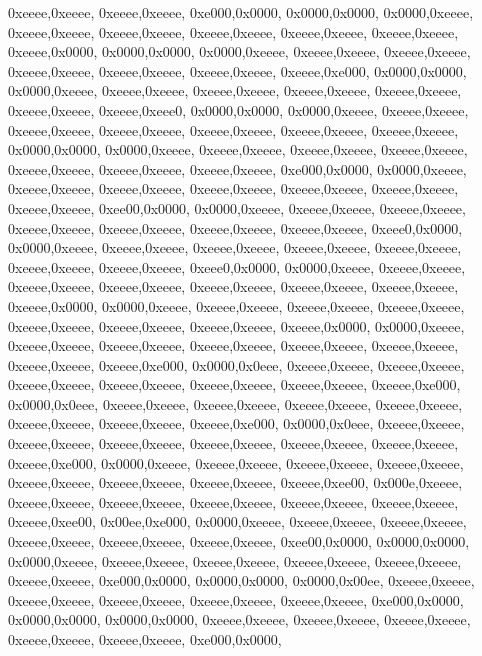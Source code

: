 {	0xeeee,0xeeee,
	0xeeee,0xeeee,
	0xe000,0x0000,
	0x0000,0x0000,
	0x0000,0xeeee,
	0xeeee,0xeeee,
	0xeeee,0xeeee,
	0xeeee,0xeeee,
	0xeeee,0xeeee,
	0xeeee,0xeeee,
	0xeeee,0x0000,
	0x0000,0x0000,
	0x0000,0xeeee,
	0xeeee,0xeeee,
	0xeeee,0xeeee,
	0xeeee,0xeeee,
	0xeeee,0xeeee,
	0xeeee,0xeeee,
	0xeeee,0xe000,
	0x0000,0x0000,
	0x0000,0xeeee,
	0xeeee,0xeeee,
	0xeeee,0xeeee,
	0xeeee,0xeeee,
	0xeeee,0xeeee,
	0xeeee,0xeeee,
	0xeeee,0xeee0,
	0x0000,0x0000,
	0x0000,0xeeee,
	0xeeee,0xeeee,
	0xeeee,0xeeee,
	0xeeee,0xeeee,
	0xeeee,0xeeee,
	0xeeee,0xeeee,
	0xeeee,0xeeee,
	0x0000,0x0000,
	0x0000,0xeeee,
	0xeeee,0xeeee,
	0xeeee,0xeeee,
	0xeeee,0xeeee,
	0xeeee,0xeeee,
	0xeeee,0xeeee,
	0xeeee,0xeeee,
	0xe000,0x0000,
	0x0000,0xeeee,
	0xeeee,0xeeee,
	0xeeee,0xeeee,
	0xeeee,0xeeee,
	0xeeee,0xeeee,
	0xeeee,0xeeee,
	0xeeee,0xeeee,
	0xee00,0x0000,
	0x0000,0xeeee,
	0xeeee,0xeeee,
	0xeeee,0xeeee,
	0xeeee,0xeeee,
	0xeeee,0xeeee,
	0xeeee,0xeeee,
	0xeeee,0xeeee,
	0xeee0,0x0000,
	0x0000,0xeeee,
	0xeeee,0xeeee,
	0xeeee,0xeeee,
	0xeeee,0xeeee,
	0xeeee,0xeeee,
	0xeeee,0xeeee,
	0xeeee,0xeeee,
	0xeee0,0x0000,
	0x0000,0xeeee,
	0xeeee,0xeeee,
	0xeeee,0xeeee,
	0xeeee,0xeeee,
	0xeeee,0xeeee,
	0xeeee,0xeeee,
	0xeeee,0xeeee,
	0xeeee,0x0000,
	0x0000,0xeeee,
	0xeeee,0xeeee,
	0xeeee,0xeeee,
	0xeeee,0xeeee,
	0xeeee,0xeeee,
	0xeeee,0xeeee,
	0xeeee,0xeeee,
	0xeeee,0x0000,
	0x0000,0xeeee,
	0xeeee,0xeeee,
	0xeeee,0xeeee,
	0xeeee,0xeeee,
	0xeeee,0xeeee,
	0xeeee,0xeeee,
	0xeeee,0xeeee,
	0xeeee,0xe000,
	0x0000,0x0eee,
	0xeeee,0xeeee,
	0xeeee,0xeeee,
	0xeeee,0xeeee,
	0xeeee,0xeeee,
	0xeeee,0xeeee,
	0xeeee,0xeeee,
	0xeeee,0xe000,
	0x0000,0x0eee,
	0xeeee,0xeeee,
	0xeeee,0xeeee,
	0xeeee,0xeeee,
	0xeeee,0xeeee,
	0xeeee,0xeeee,
	0xeeee,0xeeee,
	0xeeee,0xe000,
	0x0000,0x0eee,
	0xeeee,0xeeee,
	0xeeee,0xeeee,
	0xeeee,0xeeee,
	0xeeee,0xeeee,
	0xeeee,0xeeee,
	0xeeee,0xeeee,
	0xeeee,0xe000,
	0x0000,0xeeee,
	0xeeee,0xeeee,
	0xeeee,0xeeee,
	0xeeee,0xeeee,
	0xeeee,0xeeee,
	0xeeee,0xeeee,
	0xeeee,0xeeee,
	0xeeee,0xee00,
	0x000e,0xeeee,
	0xeeee,0xeeee,
	0xeeee,0xeeee,
	0xeeee,0xeeee,
	0xeeee,0xeeee,
	0xeeee,0xeeee,
	0xeeee,0xee00,
	0x00ee,0xe000,
	0x0000,0xeeee,
	0xeeee,0xeeee,
	0xeeee,0xeeee,
	0xeeee,0xeeee,
	0xeeee,0xeeee,
	0xeeee,0xeeee,
	0xee00,0x0000,
	0x0000,0x0000,
	0x0000,0xeeee,
	0xeeee,0xeeee,
	0xeeee,0xeeee,
	0xeeee,0xeeee,
	0xeeee,0xeeee,
	0xeeee,0xeeee,
	0xe000,0x0000,
	0x0000,0x0000,
	0x0000,0x00ee,
	0xeeee,0xeeee,
	0xeeee,0xeeee,
	0xeeee,0xeeee,
	0xeeee,0xeeee,
	0xeeee,0xeeee,
	0xe000,0x0000,
	0x0000,0x0000,
	0x0000,0x0000,
	0xeeee,0xeeee,
	0xeeee,0xeeee,
	0xeeee,0xeeee,
	0xeeee,0xeeee,
	0xeeee,0xeeee,
	0xe000,0x0000,
}

